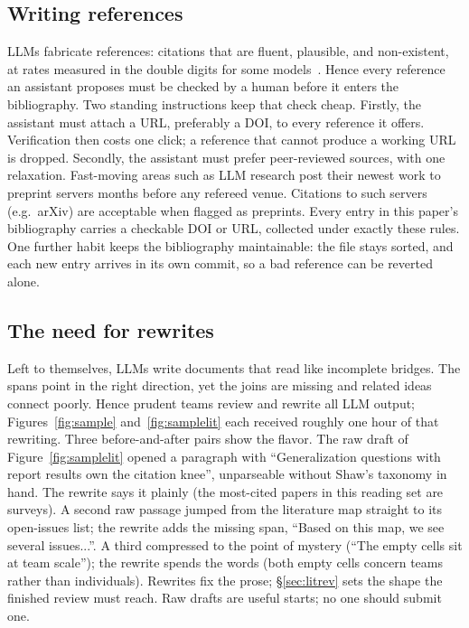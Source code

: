 \subsection{Writing references}

LLMs fabricate references: citations that are fluent, plausible,
and non-existent, at rates measured in the double digits for some
models~\cite{walters23}.
Hence every reference an assistant proposes must be checked by a
human before it enters the bibliography.
Two standing instructions keep that check cheap.
Firstly, the assistant must attach a URL, preferably a DOI, to
every reference it offers.
Verification then costs one click; a reference that cannot
produce a working URL is dropped.
Secondly, the assistant must prefer peer-reviewed sources, with
one relaxation.
Fast-moving areas such as LLM research post their newest work to
preprint servers months before any refereed venue.
Citations to such servers (e.g.\ arXiv) are acceptable when
flagged as preprints.
Every entry in this paper's bibliography carries a checkable DOI
or URL, collected under exactly these rules.
One further habit keeps the bibliography maintainable: the file
stays sorted, and each new entry arrives in its own commit, so a
bad reference can be reverted alone.

\subsection{The need for rewrites}
\label{sec:rewrites}

Left to themselves, LLMs write documents that read like
incomplete bridges.
The spans point in the right direction, yet the joins are
missing and related ideas connect poorly.
Hence prudent teams review and rewrite all LLM output;
Figures~\ref{fig:sample} and~\ref{fig:samplelit} each received
roughly one hour of that rewriting.
Three before-and-after pairs show the flavor.
The raw draft of Figure~\ref{fig:samplelit} opened a paragraph
with ``Generalization questions with report results own the
citation knee'', unparseable without Shaw's taxonomy in hand.
The rewrite says it plainly (the most-cited papers in this
reading set are surveys).
A second raw passage jumped from the literature map straight to
its open-issues list; the rewrite adds the missing span,
``Based on this map, we see several issues...''.
A third compressed to the point of mystery (``The empty cells
sit at team scale''); the rewrite spends the words (both empty
cells concern teams rather than individuals).
Rewrites fix the prose; \S\ref{sec:litrev} sets the shape the
finished review must reach.
Raw drafts are useful starts; no one should submit one.


